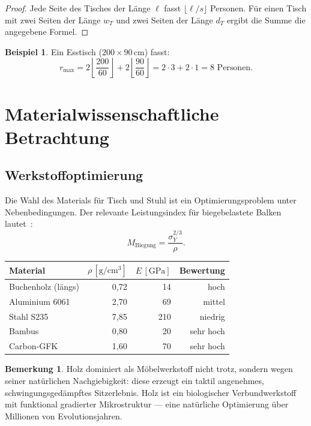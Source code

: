 ﻿\documentclass[a4paper,12pt]{article}
\theoremstyle{definition}
\newtheorem{beispiel}{Beispiel}
\newtheorem{bemerkung}{Bemerkung}
\begin{document}
\begin{proof}
	Jede Seite des Tisches der L\"{a}nge $\ell$ fasst $\lfloor \ell / s \rfloor$ Personen.
	F\"{u}r einen Tisch mit zwei Seiten der L\"{a}nge $w_T$ und zwei Seiten der L\"{a}nge $d_T$
	ergibt die Summe die angegebene Formel.
\end{proof}

\begin{beispiel}
	Ein Esstisch ($200 \times 90\,\mathrm{cm}$) fasst:
	\[
		r_{\max} = 2 \left\lfloor \frac{200}{60} \right\rfloor
		+ 2 \left\lfloor \frac{90}{60} \right\rfloor
		= 2 \cdot 3 + 2 \cdot 1 = 8 \text{ Personen.}
	\]
\end{beispiel}

\section{Materialwissenschaftliche Betrachtung}

\subsection{Werkstoffoptimierung}

Die Wahl des Materials f\"{u}r Tisch und Stuhl ist ein Optimierungsproblem unter
Nebenbedingungen. Der relevante Leistungsindex f\"{u}r biegebelastete Balken lautet~\cite{AshbyMF2011}:
\[
	M_{\mathrm{Biegung}} = \frac{\sigma_Y^{2/3}}{\rho}.
\]

\begin{center}
\begin{tabular}{lrrr}
\hline
\textbf{Material} & $\rho\,[\mathrm{g/cm^3}]$ & $E\,[\mathrm{GPa}]$ & Bewertung \\
\hline
Buchenholz (l\"{a}ngs) & 0{,}72 & 14 & hoch \\
Aluminium 6061 & 2{,}70 & 69 & mittel \\
Stahl S235 & 7{,}85 & 210 & niedrig \\
Bambus & 0{,}80 & 20 & sehr hoch \\
Carbon-GFK & 1{,}60 & 70 & sehr hoch \\
\hline
\end{tabular}
\end{center}

\begin{bemerkung}
	Holz dominiert als M\"{o}belwerkstoff nicht trotz, sondern wegen seiner nat\"{u}rlichen
	Nachgiebigkeit: diese erzeugt ein taktil angenehmes, schwingungsged\"{a}mpftes
	Sitzerlebnis. Holz ist ein biologischer Verbundwerkstoff mit funktional gradierter
	Mikrostruktur --- eine nat\"{u}rliche Optimierung \"{u}ber Millionen von Evolutionsjahren.
\end{bemerkung}
\end{document}
